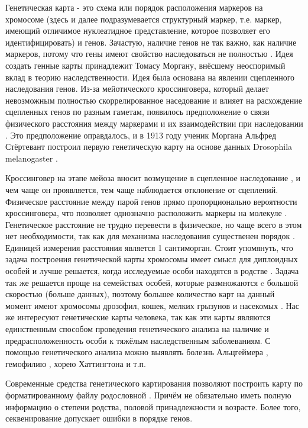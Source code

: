 \documentclass{matmex-diploma-custom}
\begin{document}
Генетическая карта - это схема или порядок расположения маркеров на
хромосоме (здесь и далее подразумевается структурный маркер,
т.е. маркер, имеющий отличимое нуклеатидное представление, которое
позволяет его идентифицировать) и генов. Зачастую, наличие генов не
так важно, как наличие маркеров, потому что гены имеют свойство
наследоваться не полностью \cite{schiller2010genome}. Идея создать
генные карты принадлежит Томасу Моргану, внёсшему неоспоримый вклад в
теорию наследственности. Идея была основана на явлении сцепленного
наследования генов. Из-за мейотического кроссинговера, который делает
невозможным полностью скоррелированное наседование и влияет на
расхождение сцепленных генов по разным гаметам, появилось
предположение о связи физического расстояния между маркерами и их
взаимодействии при наследовании \cite{creighton1931correlation}. Это
предположение оправдалось, и в 1913 году ученик Моргана Альфред
Стёртевант построил первую генетическую карту на основе данных
Drosophila melanogaster
\cite{goldhor1962genetics,sturtevant1939introduction}.

Кроссинговер на этапе мейоза вносит возмущение в сцепленное
наследование \cite{creighton1931correlation}, и чем чаще он
проявляется, тем чаще наблюдается отклонение от сцеплений. Физическое
расстояние между парой генов прямо пропорционально вероятности
кроссинговера, что позволяет однозначно расположить маркеры на
молекуле \cite{sturtevant1939introduction}. Генетическое расстояние не
трудно перевести в физическое, но чаще всего в этом нет необходимости,
так как для механизма наследования существенен порядок
\cite{hartl2011genetics, malacinski2005essentials}. Единицей измерения
расстояния является 1 сантиморган. Стоит упомянуть, что задача
построения генетической карты хромосомы имеет смысл для диплоидных
особей и лучше решается, когда исследуемые особи находятся в родстве
\cite{meiosi}. Задача так же решается проще на семействах особей,
которые размножаются c большой скоростью (больше данных), поэтому
большее количество карт на данный момент имеют хромосомы дрозофил,
кошек, мелких грызунов и насекомых \cite{mcpeek1996introduction}. Нас
же интересуют генетические карты человека, так как эти карты являются
единственным способом проведения генетического анализа на наличие и
предрасположенность особи к тяжёлым наследственным заболеваниям. С
помощью генетического анализа можно выявлять болезнь Альцгеймера
\cite{schellenberg1992genetic}, гемофилию \cite{oberle1985genetic},
хорею Хаттингтона \cite{anderson2004polymorphic} и т.п.

Современные средства генетического картирования позволяют построить
карту по форматированному файлу родословной \cite{lander1987mapmaker,
  crimap, lmmap}. Причём не обязательно иметь полную информацию о
степени родства, половой принадлежности и возрасте. Более того,
секвенирование допускает ошибки в порядке генов.
\end{document}
